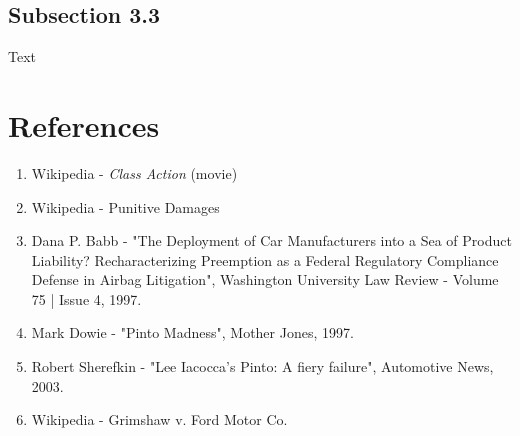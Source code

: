 \subsection{Subsection 3.3}

Text

\pagebreak



\section*{\textbf{References}}

\begin{enumerate}
	\item Wikipedia - \textit{Class Action} (movie)
	\item Wikipedia - Punitive Damages
	\item Dana P. Babb - "The Deployment of Car Manufacturers into a Sea of Product Liability? Recharacterizing Preemption as a Federal Regulatory Compliance Defense in Airbag Litigation", Washington University Law Review - Volume 75 | Issue 4, 1997.
	\item Mark Dowie - "Pinto Madness", Mother Jones, 1997.
	\item Robert Sherefkin - "Lee Iacocca's Pinto: A fiery failure", Automotive News, 2003.
	\item Wikipedia - Grimshaw v. Ford Motor Co.
\end{enumerate}

